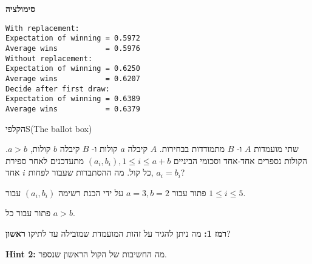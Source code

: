 \textbf{סימולציה}
\begin{verbatim}
With replacement:
Expectation of winning = 0.5972
Average wins           = 0.5976
Without replacement:
Expectation of winning = 0.6250
Average wins           = 0.6207
Decide after first draw:
Expectation of winning = 0.6389
Average wins           = 0.6379
\end{verbatim}



\begin{prob}{הקלפי}{S}{(The ballot box)}

שתי מועמדות 
$A$
ו-%
$B$
מתמודדות בבחירות. 
$A$
קיבלה
$a$
קולות ו-%
$B$
קיבלה
$b$
קולות,
$a>b$.
הקולות נספרים אחד-אחד וסכומי הביניים
$(a_i,b_i), 1\leq i \leq a+b$
מתעדכנים לאחר ספירת כל קול. מה ההסתברות שעבור לפחות
$i$
אחד,
$a_i=b_i$?

פתור עבור
$a=3, b=2$
על ידי הכנת רשימה
$(a_i,b_i)$
עבור
$1\leq i\leq 5$.

פתור עבור כל
$a>b$.

\textbf{רמז 1:} 
מה ניתן להגיד על זהות המועמדת שמובילה עד לתיקו 
\textbf{ראשון}?

\textbf{Hint 2:}
מה החשיבות של הקול הראשון שנספר.
\end{prob}

\solution{}

